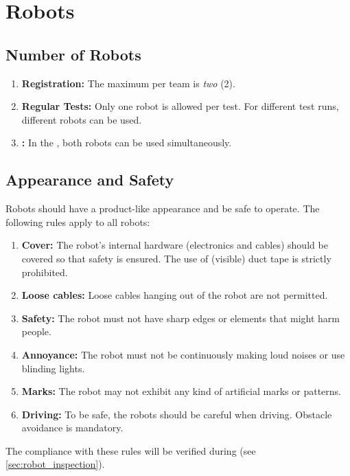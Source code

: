 \section{Robots}
\label{rule:robots}

\subsection{Number of Robots}
\label{rule:robots_number}

\begin{enumerate}
	\item \textbf{Registration:} The maximum  per team is \emph{two} (2).
	\item \textbf{Regular Tests:} Only one robot is allowed per test. For different test runs, different robots can be used.
	\item \textbf{\FINAL:} In the \FINAL, both robots can be used simultaneously.
\end{enumerate}

\subsection{Appearance and Safety}
\label{rule:robot_appearance}

Robots should have a product-like appearance and be safe to operate.
The following rules apply to all robots:
\begin{enumerate}
	\item \textbf{Cover:} The robot's internal hardware (electronics and cables) should be covered so that safety is ensured. The use of (visible) duct tape is strictly prohibited.
	\item \textbf{Loose cables:} Loose cables hanging out of the robot are not permitted.
	\item \textbf{Safety:} The robot must not have sharp edges or elements that might harm people.
	\item \textbf{Annoyance:} The robot must not be continuously making loud noises or use blinding lights.
	\item \textbf{Marks:} The robot may not exhibit any kind of artificial marks or patterns.
	\item \textbf{Driving:} To be safe, the robots should be careful when driving. Obstacle avoidance is mandatory.
\end{enumerate}
The compliance with these rules will be verified during \RobotInspection{} (see \ref{sec:robot_inspection}).







